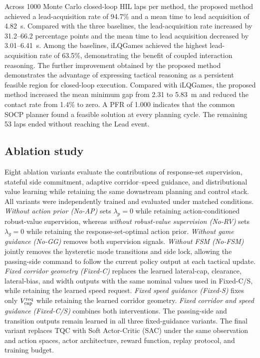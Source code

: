 \documentclass[sensors,article,submit,moreauthors]{Definitions/mdpi}
\begin{document}
Across 1000 Monte Carlo closed-loop HIL laps per method, the proposed method
achieved a lead-acquisition rate of 94.7\% and a mean time to lead acquisition of
4.82~s. Compared with the three baselines, the lead-acquisition rate increased by
31.2--66.2 percentage points and the mean time to lead acquisition decreased by
3.01--6.41~s. Among the baselines, iLQGames achieved the highest lead-acquisition rate
of 63.5\%, demonstrating the benefit of coupled interaction reasoning. The
further improvement obtained by the proposed method demonstrates the advantage
of expressing tactical reasoning as a persistent feasible region for
closed-loop execution. Compared with iLQGames, the proposed method increased
the mean minimum gap from 2.31 to 5.83~m and reduced the contact rate from
1.4\% to zero. A PFR of 1.000 indicates that the common SOCP planner found a
feasible solution at every planning cycle. The remaining 53 laps ended without
reaching the Lead event.


\subsection{Ablation study}
\label{subsec:ablation}

Eight ablation variants evaluate the contributions of response-set
supervision, stateful side commitment, adaptive corridor--speed guidance, and
distributional value learning while retaining the same downstream planning
and control stack. All variants were independently trained and evaluated under
matched conditions. \emph{Without action prior (No-AP)} sets
$\lambda_p=0$ while retaining action-conditioned robust-value supervision,
whereas \emph{without robust-value supervision (No-RV)} sets
$\lambda_g=0$ while retaining the response-set-optimal action prior.
\emph{Without game guidance (No-GG)} removes both supervision signals.
\emph{Without FSM (No-FSM)} jointly removes the hysteretic mode transitions
and side lock, allowing the passing-side command to follow the current policy
output at each tactical update. \emph{Fixed corridor geometry (Fixed-C)}
replaces the learned lateral-cap, clearance, lateral-bias, and width outputs
with the same nominal values used in Fixed-C/S, while retaining the learned
speed request. \emph{Fixed speed guidance (Fixed-S)} fixes only
$V_{\rm cap}^{\rm req}$ while retaining the learned corridor geometry.
\emph{Fixed corridor and speed guidance (Fixed-C/S)} combines both
interventions. The passing-side and transition outputs remain learned in all
three fixed-guidance variants. The final variant replaces TQC with Soft
Actor-Critic (SAC) under the same observation and action spaces, actor
architecture, reward function, replay protocol, and training budget.
\end{document}
